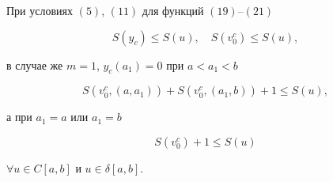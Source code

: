 \begin{lem} При условиях $(5)$, $(11)$ для функций $(19)$--$(21)$ 


\begin{equation} 


S(y_c)\le S(u),\quad S(v^c_0)\le S(u), 


\end{equation} 


в случае же $m=1$, $y_c(a_1)=0$ при $a<a_1<b$ 


\begin{equation} 


S(v^c_0,(a,a_1))+S(v^c_0,(a_1,b))+1\le S(u), 


\end{equation} 


а при $a_1=a$ или $a_1=b$ 


\begin{equation} 


S(v^c_0)+1\le S(u) 


\end{equation} 


$\forall u\in C[a,b]$ и $u\in\delta[a,b]$. 


\end{lem} 


 


